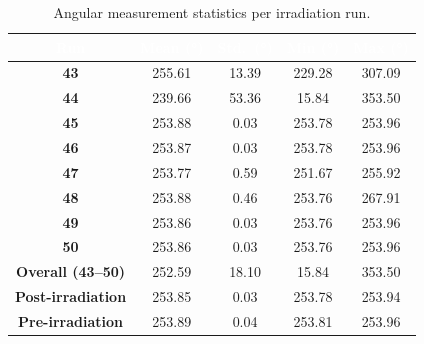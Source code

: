 \begin{table}[H]
    \centering
    \renewcommand{\arraystretch}{1.25}
    \setlength{\tabcolsep}{9pt}
    \begin{tabular}{>{\bfseries}c
                    S[table-format=3.2]
                    S[table-format=2.2]
                    S[table-format=3.2]
                    S[table-format=3.2]}
        \textcolor{white}{\textbf{Run}} &
        {\textcolor{white}{\textbf{Mean (\si{\degree})}}} &
        {\textcolor{white}{\textbf{Std.\ (\si{\degree})}}} &
        {\textcolor{white}{\textbf{Min (\si{\degree})}}} &
        {\textcolor{white}{\textbf{Max (\si{\degree})}}} \\
        \hline
        43 & 255.61 & 13.39 & 229.28 & 307.09 \\
        44 & 239.66 & 53.36 & 15.84  & 353.50 \\
        45 & 253.88 & 0.03  & 253.78 & 253.96 \\
        46 & 253.87 & 0.03  & 253.78 & 253.96 \\
        47 & 253.77 & 0.59  & 251.67 & 255.92 \\
        48 & 253.88 & 0.46  & 253.76 & 267.91 \\
        49 & 253.86 & 0.03  & 253.76 & 253.96 \\
        50 & 253.86 & 0.03  & 253.76 & 253.96 \\
        \hline
        Overall (43--50) & 252.59 & 18.10 & 15.84  & 353.50 \\
        Post-irradiation & 253.85 & 0.03  & 253.78 & 253.94 \\
        Pre-irradiation  & 253.89 & 0.04  & 253.81 & 253.96 \\
        \hline
    \end{tabular}
    \caption{Angular measurement statistics per irradiation run.}
    \label{tab:angular-statistics-per-run}
\end{table}

